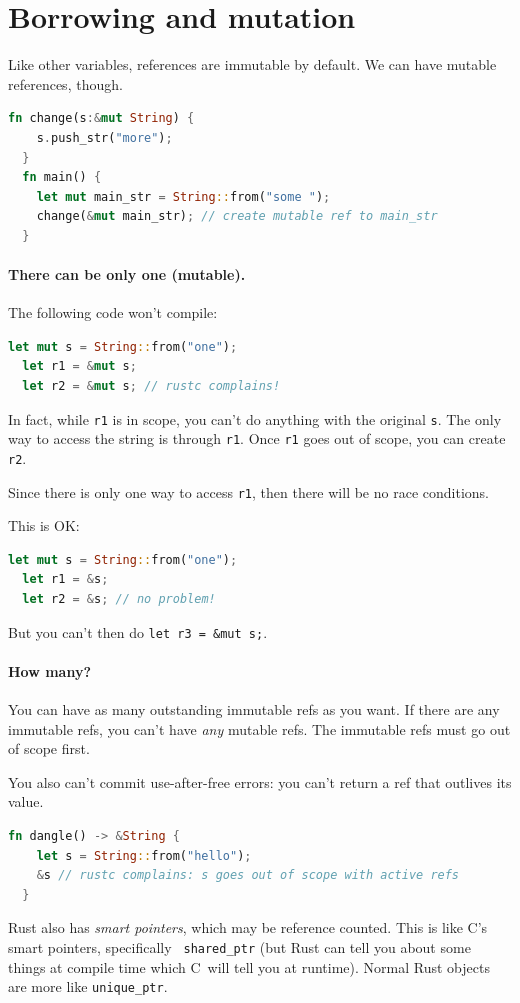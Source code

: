 \documentclass[a4paper]{report}
\newcommand{\CPP}{C\nolinebreak\hspace{-.05em}\raisebox{.4ex}{\tiny\bf +}\nolinebreak\hspace{-.10em}\raisebox{.4ex}{\tiny\bf +}}
\def\CPP{{C\nolinebreak[4]\hspace{-.05em}\raisebox{.4ex}{\tiny\bf ++}}}
\begin{document}
\section*{Borrowing and mutation} Like other variables, references are immutable by default.
We can have mutable references, though.
\begin{lstlisting}[language=Rust]
  fn change(s:&mut String) {
    s.push_str("more");
  }
  fn main() {
    let mut main_str = String::from("some ");
    change(&mut main_str); // create mutable ref to main_str
  }
\end{lstlisting}

\paragraph{There can be only one (mutable).} The following code won't compile:
\begin{lstlisting}[language=Rust]
  let mut s = String::from("one");
  let r1 = &mut s;
  let r2 = &mut s; // rustc complains!
\end{lstlisting}
In fact, while {\tt r1} is in scope, you can't do anything with the original {\tt s}.
The only way to access the string is through {\tt r1}. Once {\tt r1} goes out of scope,
you can create {\tt r2}.

Since there is only one way to access {\tt r1}, then there will be no race conditions.

This is OK:
\begin{lstlisting}[language=Rust]
  let mut s = String::from("one");
  let r1 = &s;
  let r2 = &s; // no problem!
\end{lstlisting}
But you can't then do {\tt let r3 = \&mut s;}.

\paragraph{How many?} You can have as many outstanding immutable refs as you want.
If there are any immutable refs, you can't have \emph{any} mutable refs. The immutable
refs must go out of scope first.

You also can't commit use-after-free errors: you can't return a ref that outlives
its value.
\begin{lstlisting}[language=Rust]
  fn dangle() -> &String {
    let s = String::from("hello");
    &s // rustc complains: s goes out of scope with active refs
  }
\end{lstlisting}

Rust also has \emph{smart pointers}, which may be reference
counted. This is like \CPP's smart pointers, specifically {\tt
  shared\_ptr} (but Rust can tell you about some things at compile
time which \CPP~will tell you at runtime). Normal Rust objects are more
like {\tt unique\_ptr}.
\end{document}
